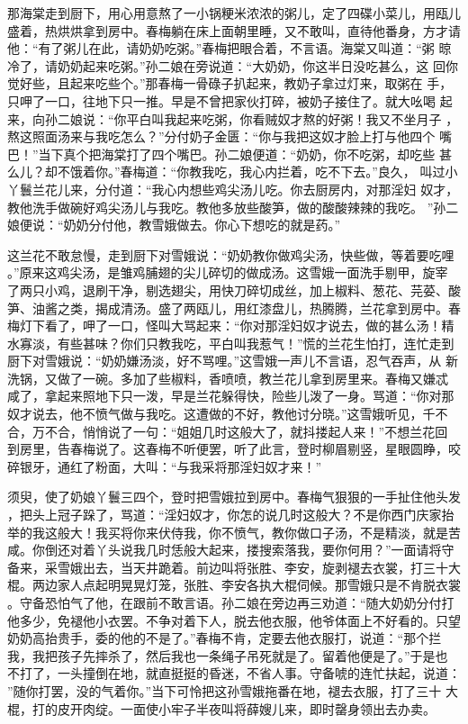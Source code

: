 那海棠走到厨下，用心用意熬了一小锅粳米浓浓的粥儿，定了四碟小菜儿，用瓯儿
盛着，热烘烘拿到房中。春梅躺在床上面朝里睡，又不敢叫，直待他番身，方才请
他：“有了粥儿在此，请奶奶吃粥。”春梅把眼合着，不言语。海棠又叫道：“粥
晾冷了，请奶奶起来吃粥。”孙二娘在旁说道：“大奶奶，你这半日没吃甚么，这
回你觉好些，且起来吃些个。”那春梅一骨碌子扒起来，教奶子拿过灯来，取粥在
手，只呷了一口，往地下只一推。早是不曾把家伙打碎，被奶子接住了。就大吆喝
起来，向孙二娘说：“你平白叫我起来吃粥，你看贼奴才熬的好粥！我又不坐月子
，熬这照面汤来与我吃怎么？”分付奶子金匮：“你与我把这奴才脸上打与他四个
嘴巴！”当下真个把海棠打了四个嘴巴。孙二娘便道：“奶奶，你不吃粥，却吃些
甚么儿？却不饿着你。”春梅道：“你教我吃，我心内拦着，吃不下去。”良久，
叫过小丫鬟兰花儿来，分付道：“我心内想些鸡尖汤儿吃。你去厨房内，对那淫妇
奴才，教他洗手做碗好鸡尖汤儿与我吃。教他多放些酸笋，做的酸酸辣辣的我吃。
”孙二娘便说：“奶奶分付他，教雪娥做去。你心下想吃的就是药。”

这兰花不敢怠慢，走到厨下对雪娥说：“奶奶教你做鸡尖汤，快些做，等着要吃哩
。”原来这鸡尖汤，是雏鸡脯翅的尖儿碎切的做成汤。这雪娥一面洗手剔甲，旋宰
了两只小鸡，退刷干净，剔选翅尖，用快刀碎切成丝，加上椒料、葱花、芫荽、酸
笋、油酱之类，揭成清汤。盛了两瓯儿，用红漆盘儿，热腾腾，兰花拿到房中。春
梅灯下看了，呷了一口，怪叫大骂起来：“你对那淫妇奴才说去，做的甚么汤！精
水寡淡，有些甚味？你们只教我吃，平白叫我惹气！”慌的兰花生怕打，连忙走到
厨下对雪娥说：“奶奶嫌汤淡，好不骂哩。”这雪娥一声儿不言语，忍气吞声，从
新洗锅，又做了一碗。多加了些椒料，香喷喷，教兰花儿拿到房里来。春梅又嫌忒
咸了，拿起来照地下只一泼，早是兰花躲得快，险些儿泼了一身。骂道：“你对那
奴才说去，他不愤气做与我吃。这遭做的不好，教他讨分晓。”这雪娥听见，千不
合，万不合，悄悄说了一句：“姐姐几时这般大了，就抖搂起人来！”不想兰花回
到房里，告春梅说了。这春梅不听便罢，听了此言，登时柳眉剔竖，星眼圆睁，咬
碎银牙，通红了粉面，大叫：“与我采将那淫妇奴才来！”

须臾，使了奶娘丫鬟三四个，登时把雪娥拉到房中。春梅气狠狠的一手扯住他头发
，把头上冠子跺了，骂道：“淫妇奴才，你怎的说几时这般大？不是你西门庆家抬
举的我这般大！我买将你来伏侍我，你不愤气，教你做口子汤，不是精淡，就是苦
咸。你倒还对着丫头说我几时恁般大起来，搂搜索落我，要你何用？”一面请将守
备来，采雪娥出去，当天井跪着。前边叫将张胜、李安，旋剥褪去衣裳，打三十大
棍。两边家人点起明晃晃灯笼，张胜、李安各执大棍伺候。那雪娥只是不肯脱衣裳
。守备恐怕气了他，在跟前不敢言语。孙二娘在旁边再三劝道：“随大奶奶分付打
他多少，免褪他小衣罢。不争对着下人，脱去他衣服，他爷体面上不好看的。只望
奶奶高抬贵手，委的他的不是了。”春梅不肯，定要去他衣服打，说道：“那个拦
我，我把孩子先摔杀了，然后我也一条绳子吊死就是了。留着他便是了。”于是也
不打了，一头撞倒在地，就直挺挺的昏迷，不省人事。守备唬的连忙扶起，说道：
”随你打罢，没的气着你。”当下可怜把这孙雪娥拖番在地，褪去衣服，打了三十
大棍，打的皮开肉绽。一面使小牢子半夜叫将薛嫂儿来，即时罄身领出去办卖。

